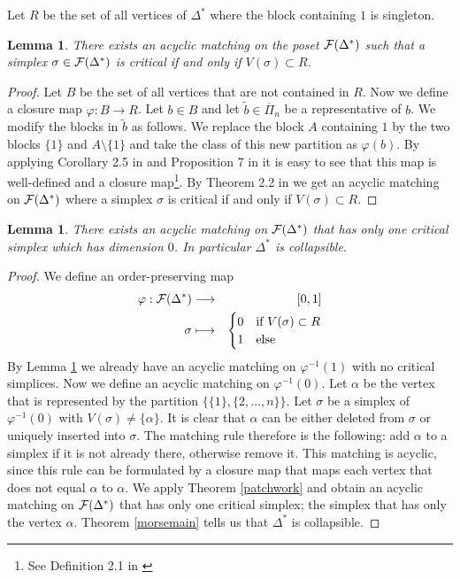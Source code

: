 \documentclass{elsarticle}
\newtheorem{lem}[df]{Lemma}
\begin{document}
Let $R$ be the set of all vertices of $\Delta^*$ where the block containing $1$ is singleton.
\begin{lem}
\label{simplclosure}
There exists an acyclic matching on the poset ${\cal F}(\Delta^*)$ such that a simplex $\sigma\in{\cal F}(\Delta^*)$ is critical if and only if  $V(\sigma)\subset R$.
\end{lem}
\begin{proof}
Let $B$ be the set of all vertices that are not contained in $R$. Now we define a closure map $\varphi:B\longrightarrow R$. Let $b\in B$ and let $\tilde b\in\overline{\Pi}_n$ be a representative of $b$. We modify the blocks in $\tilde b$ as follows. We replace the block $A$ containing $1$ by the two blocks $\{1\}$ and $A\setminus\{1\}$ and take the class of this new partition as $\varphi(b)$. By applying Corollary 2.5 in \cite{clmap} and Proposition 7 in \cite{jule} it is easy to see that this map is well-defined and a closure map\footnote{See Definition 2.1 in \cite{clmap}}. By Theorem 2.2 in \cite{clmap} we get an acyclic matching on ${\cal F}(\Delta^*)$ where a simplex $\sigma$ is critical if and only if  $V(\sigma)\subset R$.
\end{proof}
\begin{lem}
\label{mitte_paper1}
There exists an acyclic matching on ${\cal F}(\Delta^*)$ that has only one critical simplex which has dimension $0$. In particular $\Delta^*$ is collapsible.
\end{lem}
\begin{proof}
We define an order-preserving map
\begin{eqnarray*}
\varphi:{\cal F}(\Delta^*)&\longrightarrow&[0,1]\\
\sigma&\longmapsto&
\begin{cases}
0&\text{if $V(\sigma)\subset R$}\\
1&\text{else}
\end{cases}
\end{eqnarray*}
By Lemma \ref{simplclosure} we already have an acyclic matching on $\varphi^{-1}(1)$ with no critical simplices. Now we define an acyclic matching on $\varphi^{-1}(0)$. Let $\alpha$ be the vertex that is represented by the partition $\{\{1\},\{2,\dots,n\}\}$. Let $\sigma$ be a simplex of $\varphi^{-1}(0)$ with $V(\sigma)\not=\{\alpha\}$. It is clear that $\alpha$ can be either deleted from $\sigma$ or uniquely inserted into $\sigma$. The matching rule therefore is the following: add $\alpha$ to a simplex if it is not already there, otherwise remove it. This matching is acyclic, since this rule can be formulated by a closure map that maps each vertex that does not equal $\alpha$ to $\alpha$. We apply Theorem \ref{patchwork} and obtain an acyclic matching on ${\cal F}(\Delta^*)$ that has only one critical simplex; the simplex that has only the vertex $\alpha$. Theorem \ref{morsemain} tells us that $\Delta^*$ is collapsible.
\end{proof}
\end{document}
